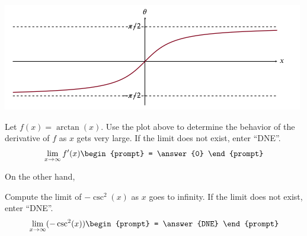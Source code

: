 \documentclass{ximera}
\begin{document}
\begin{image}
\includegraphics{backupInverse.png}
\end{image}

\begin{problem}
  Let $f(x) = \arctan(x)$. Use the plot above to determine the behavior of the derivative of $f$ as $x$ gets very large.  If the limit does not exist, enter ``DNE''.
  \[
  \lim_{x\to \infty} f'(x)
  \begin{prompt}
    = \answer{0}
  \end{prompt}
  \]
\end{problem}

On the other hand,

\begin{problem}
  Compute the limit of $- \csc^2 (x)$ as $x$ goes to infinity.  If the limit does not exist, enter ``DNE''.
  \[
  \lim_{x\to \infty}(-\csc^2 (x))
  \begin{prompt}
    = \answer{DNE}
  \end{prompt}
  \]
\end{problem}
\end{document}
